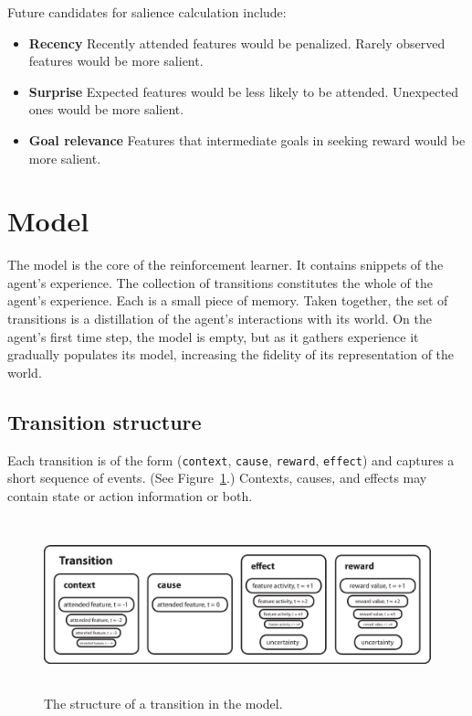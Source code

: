 Future candidates for salience calculation include:

\begin{itemize}
\item {\bf Recency}  Recently attended features would be penalized. Rarely observed features would be more salient.
\item {\bf Surprise} Expected features would be less likely to be attended. Unexpected ones would be more salient.
\item {\bf Goal relevance} Features that intermediate goals in seeking reward would be more salient.
\end{itemize}


\section{Model}
The model is the core of the reinforcement learner. It contains snippets of the agent's experience. The collection of transitions constitutes the whole of the agent's experience. Each is a small piece of memory. Taken together, the set of transitions is a distillation of the agent's interactions with its world. On the agent's first time step, the model is empty, but as it gathers experience it gradually populates its model, increasing the fidelity of its representation of the world. 

\subsection{Transition structure}

Each transition is of the form (\texttt{context}, \texttt{cause}, \texttt{reward}, \texttt{effect}) and captures a short sequence of events. (See Figure~\ref{transition_structure}.) Contexts, causes, and effects may contain state or action information or both.

\begin{figure}
\centering
\includegraphics[height=5cm]{figs/transition.eps}
\caption{The structure of a transition in the model.}
\label{transition_structure}
\end{figure}

